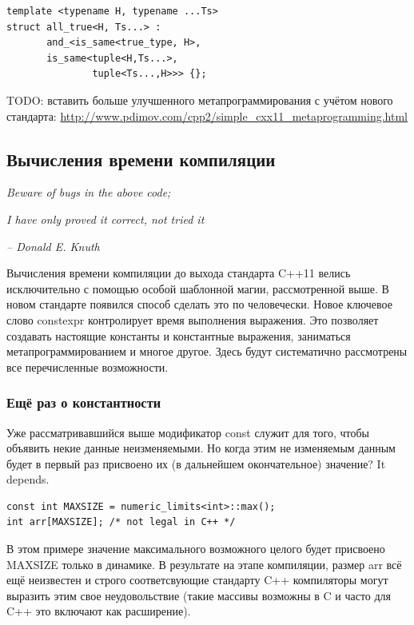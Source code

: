 \documentclass[a4paper,12pt,oneside]{article}
\begin{document}
\begin{lstlisting}
template <typename H, typename ...Ts>
struct all_true<H, Ts...> : 
       and_<is_same<true_type, H>, 
       is_same<tuple<H,Ts...>,
               tuple<Ts...,H>>> {};
\end{lstlisting}
\fi

TODO: вставить больше улучшенного метапрограммирования с учётом нового стандарта:
\url{http://www.pdimov.com/cpp2/simple_cxx11_metaprogramming.html}

\pagebreak
\subsection{Вычисления времени компиляции}

\hfill\textit{Beware of bugs in the above code;}

\hfill\textit{I have only proved it correct, not tried it}{\vspace{0.5em}}

\hfill\textit{-- Donald E. Knuth}

Вычисления времени компиляции до выхода стандарта C++11 велись исключительно с помощью особой шаблонной магии, рассмотренной выше. В новом стандарте появился способ сделать это по человечески. Новое ключевое слово constexpr контролирует время выполнения выражения. Это позволяет создавать настоящие константы и константные выражения, заниматься метапрограммированием и многое другое. Здесь будут систематично рассмотрены все перечисленные возможности.

\subsubsection{Ещё раз о константности}

Уже рассматривавшийся выше модификатор const служит для того, чтобы объявить некие данные неизменяемыми. Но когда этим не изменяемым данным будет в первый раз присвоено их (в дальнейшем окончательное) значение? It depends.

\begin{lstlisting}
const int MAXSIZE = numeric_limits<int>::max();
int arr[MAXSIZE]; /* not legal in C++ */
\end{lstlisting}

В этом примере значение максимального возможного целого будет присвоено MAXSIZE только в динамике. В результате на этапе компиляции, размер arr всё ещё неизвестен и строго соответсвующие стандарту C++ компиляторы могут выразить этим свое неудовольствие (такие массивы возможны в C и часто для C++ это включают как расширение).
\end{document}
